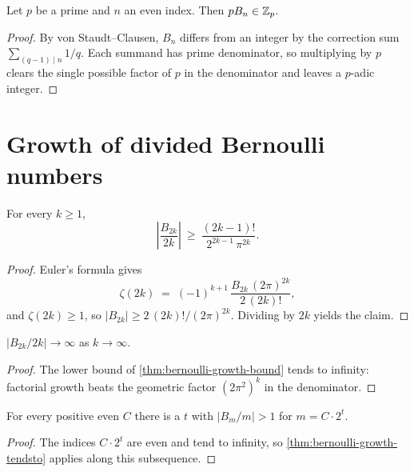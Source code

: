 \begin{lemma}\label{lem:vonstaudt-p-integral}
  \leanok
Let $p$ be a prime and $n$ an even index.  Then $pB_n \in \mathbb{Z}_p$.
\end{lemma}
\begin{proof}\leanok
By von Staudt--Clausen, $B_n$ differs from an integer by the correction
sum $\sum_{(q-1)\mid n} 1/q$.  Each summand has prime denominator, so
multiplying by $p$ clears the single possible factor of $p$ in the
denominator and leaves a $p$-adic integer.
\end{proof}

\section{Growth of divided Bernoulli numbers}

\begin{theorem}\label{thm:bernoulli-growth-bound}
  \leanok
For every $k \ge 1$,
\[
  \left|\frac{B_{2k}}{2k}\right|
    \ \ge\ \frac{(2k-1)!}{2^{2k-1}\,\pi^{2k}}.
\]
\end{theorem}
\begin{proof}\leanok
Euler's formula gives
\[
  \zeta(2k) \;=\; (-1)^{k+1}\,\frac{B_{2k}\,(2\pi)^{2k}}{2\,(2k)!},
\]
and $\zeta(2k) \ge 1$, so $|B_{2k}| \ge 2\,(2k)!/(2\pi)^{2k}$.  Dividing by
$2k$ yields the claim.
\end{proof}

\begin{theorem}\label{thm:bernoulli-growth-tendsto}
  \leanok
$\left|B_{2k}/2k\right| \to \infty$ as $k \to \infty$.
\end{theorem}
\begin{proof}\leanok
The lower bound of \cref{thm:bernoulli-growth-bound} tends to infinity:
factorial growth beats the geometric factor $(2\pi^2)^{k}$ in the
denominator.
\end{proof}

\begin{corollary}\label{cor:bernoulli-large-multiple}
  \leanok
For every positive even $C$ there is a $t$ with
$\left|B_{m}/m\right| > 1$ for $m = C\cdot 2^t$.
\end{corollary}
\begin{proof}\leanok
The indices $C \cdot 2^t$ are even and tend to infinity, so
\cref{thm:bernoulli-growth-tendsto} applies along this subsequence.
\end{proof}

